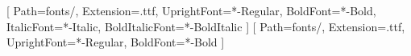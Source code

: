 

\renewcommand{\beamerbgcolor}{ozean}
\renewcommand{\beamertitlecolor}{pfirsich}
\renewcommand{\beamertextcolor}{white}
\renewcommand{\beamerfootertextcolor}{white}

\usepackage{fontspec}
\renewfontfamily{}[
	Path=fonts/,
	Extension=.ttf,
	UprightFont=*-Regular,
	BoldFont=*-Bold,
	ItalicFont=*-Italic,
	BoldItalicFont=*-BoldItalic
]
\newfontfamily{}[
	Path=fonts/,
	Extension=.ttf,
	UprightFont=*-Regular,
	BoldFont=*-Bold
]
